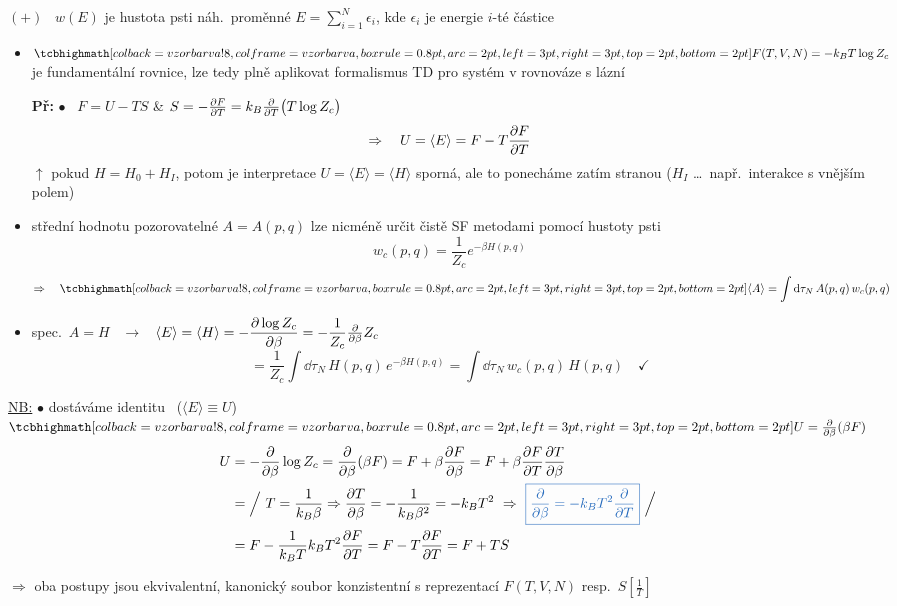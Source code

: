 \textcolor{NavyBlue}{$(+)$ \ $w(E)$ je hustota psti náh.\ proměnné $E = \sum_{i=1}^{N}\epsilon_i$, kde $\epsilon_i$ je energie $i$-té částice}

\begin{itemize}
  \item $\vzorec{F(T,V,N) = -k_BT\log Z_c}$ je fundamentální rovnice, lze tedy plně aplikovat formalismus TD pro systém v rovnováze s lázní

  \textbf{Př:} \quad $\bullet$ \ $F = U - TS$ \quad \& \quad $S = -\pdv{F}{T} = k_B\pdv{T}\big(T\log Z_c\big)$
  \[
    \Rightarrow\quad U = \langle E\rangle = F - T\pdv{F}{T}
  \]
  \hspace*{2.4cm}$\uparrow$ pokud $H = H_0 + H_I$, potom je interpretace $U = \langle E\rangle = \langle H\rangle$ sporná, ale to ponecháme zatím stranou ($H_I$ \dots\ např.\ interakce s vnějším polem)
  \item střední hodnotu pozorovatelné $A = A(p,q)$ lze nicméně určit čistě SF metodami pomocí hustoty psti
  \[
    w_c(p,q) = \frac{1}{Z_c}e^{-\beta H(p,q)}
  \]
  \[
    \Rightarrow\quad \vzorec{\langle A\rangle = \int\dd\tau_N\,A(p,q)\,w_c(p,q)}
  \]
  \item spec.\ $A = H$ \ $\to$ \ $\langle E\rangle = \langle H\rangle = -\dfrac{\partial\log Z_c}{\partial\beta} = -\dfrac{1}{Z_c}\pdv{\beta}Z_c$
  \[
    = \frac{1}{Z_c}\int\dd\tau_N\,H(p,q)\,e^{-\beta H(p,q)} = \int\dd\tau_N\,w_c(p,q)\,H(p,q) \quad\checkmark
  \]
\end{itemize}

\underline{NB:} $\bullet$ dostáváme identitu \ ($\langle E\rangle\equiv U$) \quad $\vzorec{U = \pdv{\beta}(\beta F)}$
\begin{align*}
  U &= -\pdv{\beta}\log Z_c = \pdv{\beta}(\beta F) = F + \beta\pdv{F}{\beta} = F + \beta\pdv{F}{T}\pdv{T}{\beta} \\
  &= \Big/\ T = \frac{1}{k_B\beta} \Rightarrow \pdv{T}{\beta} = -\frac{1}{k_B\beta^2} = -k_BT^2
     \ \Rightarrow\ \textcolor{NavyBlue}{\boxed{\pdv{\beta} = -k_BT^2\pdv{T}}}\ \Big/ \\
  &= F - \frac{1}{k_BT}k_BT^2\pdv{F}{T} = F - T\pdv{F}{T} = F + TS
\end{align*}

$\Rightarrow$ oba postupy jsou ekvivalentní, kanonický soubor konzistentní s reprezentací $F(T,V,N)$ resp.\ $S[\frac1T]$

